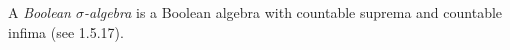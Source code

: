 A \textit{Boolean $\sigma$-algebra} is a Boolean algebra with countable suprema and countable infima (see 1.5.17).
